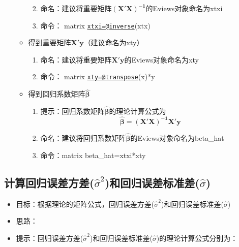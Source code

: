 \documentclass[12pt,(landscape,a4paper),(portrait,a4paper)]{article}
\providecommand{\tightlist}{%
  \setlength{\itemsep}{0pt}\setlength{\parskip}{0pt}}
\begin{document}
\begin{itemize}
\begin{itemize}
    \begin{enumerate}
    \def\labelenumi{\alph{enumi}.}
    \tightlist
    \item
      命名：建议将重要矩阵\(\mathbf{{(X'X)}^{-1}}\)的Eviews对象命名为xtxi
    \item
      命令： matrix
      \href{mailto:xtxi=@inverse}{\nolinkurl{xtxi=@inverse}}(xtx)
    \end{enumerate}
  \item
    得到重要矩阵\(\mathbf{X'y}\)（建议命名为xty）

    \begin{enumerate}
    \def\labelenumi{\alph{enumi}.}
    \item
      命名：建议将重要矩阵\(\mathbf{X'y}\)的Eviews对象命名为xty
    \item
      命令： matrix
      \href{mailto:xty=@transpose}{\nolinkurl{xty=@transpose}}(x)*y
    \end{enumerate}
  \item
    得到回归系数矩阵\(\mathbf{\hat{\beta}}\)

    \begin{enumerate}
    \def\labelenumi{\alph{enumi}.}
    \item
      提示：回归系数矩阵\(\mathbf{\hat{\beta}}\)的理论计算公式为
      \[\mathbf{\hat{\beta}}=\mathbf{{(X'X)}^{-1}X'y}\]
    \item
      命名：建议将回归系数矩阵\(\mathbf{\hat{\beta}}\)的Eviews对象命名为beta\_hat
    \item
      命令：matrix beta\_hat=xtxi*xty
    \end{enumerate}
  \end{itemize}
\end{itemize}

\hypertarget{hatsigma2hatsigma}{%
\subsection{\texorpdfstring{计算回归误差方差(\(\hat{\sigma}^2\))和回归误差标准差(\(\hat{\sigma}\))}{计算回归误差方差(\textbackslash{}hat\{\textbackslash{}sigma\}\^{}2)和回归误差标准差(\textbackslash{}hat\{\textbackslash{}sigma\})}}\label{hatsigma2hatsigma}}

\begin{itemize}
\tightlist
\item
  目标：根据理论的矩阵公式，回归误差方差(\(\hat{\sigma}^2\))和回归误差标准差(\(\hat{\sigma}\))
\item
  思路：
\item
  提示：回归误差方差(\(\hat{\sigma}^2\))和回归误差标准差(\(\hat{\sigma}\))的理论计算公式分别为：
\end{itemize}
\end{document}
